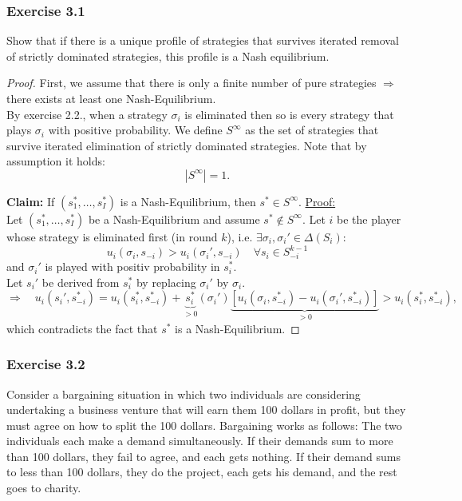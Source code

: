 \documentclass[12pt]{extreport} %
\theoremstyle{named}
\theoremstyle{itshape}
\theoremstyle{normal}
\begin{document}
\subsubsection*{Exercise 3.1}
	Show that if there is a unique profile of strategies that survives iterated removal of strictly dominated strategies, this profile is a Nash equilibrium.

	\begin{proof}
  		First, we assume that there is only a finite number of pure strategies $\Rightarrow$ there exists at least one Nash-Equilibrium. ~\\
  
  		By exercise 2.2., when a strategy $\sigma_{i}$ is eliminated then so is every strategy that plays $\sigma_{i}$ with positive probability. We define $S^{\infty}$ as the set of strategies that survive iterated elimination of strictly dominated strategies. Note that by assumption it holds:
  		$$ \left| S^{\infty} \right| = 1. $$
  
  \textbf{Claim:} If $\left(s_{1}^{*}, \dotsc, s_{I}^{*} \right)$ is a Nash-Equilibrium, then $s^{*} \in S^{\infty}$. \underline{Proof:} ~\\

  	Let $\left( s_{1}^{*}, \dotsc, s_{I}^{*} \right)$ be a Nash-Equilibrium and assume $s^{*} \notin S^{\infty}$. Let $i$ be the player whose strategy is eliminated first (in round $k$), i.e. $\exists \sigma_{i}, \sigma_{i}' \in \Delta\left(S_{i}\right)$:
  	$$ u_{i}(\sigma_{i}, s_{-i}) > u_{i}(\sigma_{i}', s_{-i}) \quad \forall s_{i} \in S_{-i}^{k-1} $$
  	and $\sigma_{i}'$ is played with positiv probability in $s_{i}^{*}$. ~\\
  	
  	Let $s_{i}'$ be derived from $s_{i}^{*}$ by replacing $\sigma_{i}'$ by $\sigma_{i}$.
  	$$ \Rightarrow \quad u_{i}(s_{i}', s_{-i}^{*}) = u_{i}(s_{i}^{*},  s_{-i}^{*}) + \underbrace{s_{i}^{*}}_{> 0}(\sigma_{i}')\underbrace{\left[ u_{i}(\sigma_{i}, s_{-i}^{*}) - u_{i}(\sigma_{i}', s_{-i}^{*}) \right]}_{> 0}  > u_{i}(s_{i}^{*}, s_{-i}^{*}), $$
  which contradicts the fact that $s^{*}$ is a Nash-Equilibrium.
  \end{proof}
  
  
\subsubsection*{Exercise 3.2}


Consider a bargaining situation in which two individuals are considering undertaking a business venture that will earn them 100 dollars in profit, but they must agree on how to split the 100 dollars. Bargaining works as follows: The two individuals each make a demand simultaneously. If their demands sum to more than 100 dollars, they fail to agree, and each gets nothing. If their demand sums to less than 100 dollars, they do the project, each gets his demand, and the rest goes to charity.
\end{document}
